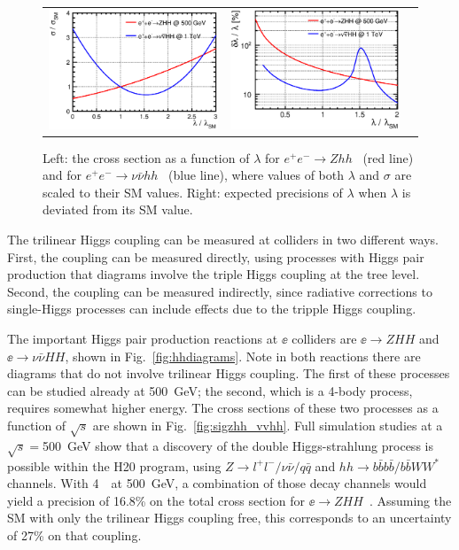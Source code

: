 \begin{figure}[htb]
  \centering
  \begin{tabular}[c]{ccc}
    \includegraphics[width=0.45\hsize]{chapters/figures/xsec_coupling_BSM.eps} &
    \includegraphics[width=0.45\hsize]{chapters/figures/precision_BSM_HHH.eps} \\   
 \end{tabular}
  \caption{Left: the cross section as a function of $\lambda$ for $e^+e^-\to Zhh$ ~(red line) and for 
  $e^+e^-\to\nu\bar{\nu}hh$ ~(blue line), where values of both $\lambda$ and $\sigma$ are scaled to their 
  SM values. Right: expected precisions of $\lambda$ when $\lambda$ is deviated from its SM value.}
  \label{fig:HHHBSM}
\end{figure}

The  trilinear Higgs coupling can be measured at colliders in two
different ways. First, the coupling can be measured directly, using 
processes with Higgs pair production
that  diagrams involve the triple Higgs coupling at the tree level. 
Second, the coupling can be measured indirectly, since
radiative corrections to single-Higgs processes can include effects
due to the tripple Higgs coupling.

The important Higgs pair production reactions at $\ee$ colliders are 
$\ee\to ZHH$ and $\ee\to \nu\bar\nu HH$, shown in Fig.~\ref{fig:hhdiagrams}. 
Note in both reactions there are diagrams that do not involve trilinear Higgs coupling.
The first of these processes can be studied already at 500~GeV; 
the second, which is a 4-body process, requires somewhat higher energy. 
The cross sections of these two processes as a function of $\sqrt{s}$ are shown in Fig.~\ref{fig:sigzhh_vvhh}.
Full simulation studies at a $\sqrt{s}=$500~GeV show that a discovery of the
double Higgs-strahlung process is possible within the H20 program, 
using $Z\to l^+l^-/\nu\bar{\nu}/q\bar{q}$ and $hh\to b\bar{b}b\bar{b}/b\bar{b}WW^*$ channels.
With 4~\iab\ at 500~GeV, a combination of those decay channels
would yield a precision of 16.8\% on the total cross section for
$\ee\to ZHH$~\cite{Duerig:2016dvi,Tian:2013qmi,KurataHHH}.  Assuming the SM with only the
trilinear Higgs coupling free, this corresponds to an uncertainty of
27\% on that coupling.

